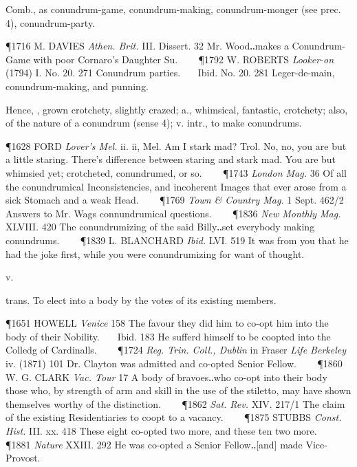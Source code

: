 \begin{description}[wide, labelwidth=!, labelindent=0pt]
\begin{myenumerate}
 Comb., as conundrum-game, conundrum-making, conundrum-monger (see prec. 4), conundrum-party.

\P 1716 M. DAVIES  \textit{Athen. Brit.} III. Dissert. 32 Mr. Wood‥makes a Conundrum-Game with poor Cornaro's Daughter Su.    
\P 1792 W. ROBERTS  \textit{Looker-on} (1794) I. No. 20. 271 Conundrum parties.    Ibid. No. 20. 281 Leger-de-main, conundrum-making, and punning.

\noindent
Hence, , grown crotchety, slightly crazed;  a., whimsical, fantastic, crotchety; also, of the nature of a conundrum (sense 4);  v. intr., to make conundrums.

\P 1628 FORD  \textit{Lover's Mel.} ii. ii, Mel. Am I stark mad? Trol. No, no, you are but a little staring. There's difference between staring and stark mad. You are but whimsied yet; crotcheted, conundrumed, or so.    
\P 1743 \textit{London  Mag.} 36 Of all the conundrumical Inconsistencies, and incoherent Images that ever arose from a sick Stomach and a weak Head.    
\P 1769 \textit{Town \& Country  Mag.} 1 Sept. 462/2 Answers to Mr. Wags connundrumical questions.    
\P 1836  \textit{New Monthly Mag.} XLVIII. 420 The conundrumizing of the said Billy‥set everybody making conundrums.    
\P 1839 L. BLANCHARD  \textit{Ibid.} LVI. 519 It was from you that he had the joke first, while you were conundrumizing for want of thought.
\end{myenumerate}


 v.

\noindent {}

\vspace{-0.3cm}

\begin{myenumerate}

 trans. To elect into a body by the votes of its existing members.

\P 1651 HOWELL  \textit{Venice} 158 The favour they did him to co-opt him into the body of their Nobility.    Ibid. 183 He sufferd himself to be coopted into the Colledg of Cardinalls.    
\P 1724 \textit{Reg.  Trin. Coll., Dublin} in Fraser \textit{Life Berkeley} iv. (1871) 101 Dr. Clayton was admitted and co-opted Senior Fellow.    
\P 1860 W. G. CLARK  \textit{Vac. Tour} 17 A body of bravoes‥who co-opt into their body those who, by strength of arm and skill in the use of the stiletto, may have shown themselves worthy of the distinction.    
\P 1862  \textit{Sat. Rev.} XIV. 217/1 The claim of the existing Residentiaries to coopt to a vacancy.    
\P 1875 STUBBS  \textit{Const. Hist.} III. xx. 418 These eight co-opted two more, and these ten two more.    
\P 1881  \textit{Nature} XXIII. 292 He was co-opted a Senior Fellow‥[and] made Vice-Provost.


\end{myenumerate}
\end{description}
